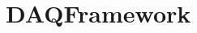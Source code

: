 \chapter{DAQFramework}
\hypertarget{md_template_2README}{}\label{md_template_2README}
\label{md_template_2README_autotoc_md1}%
%
